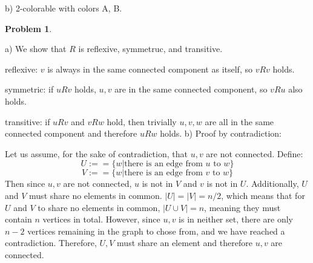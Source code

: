 \documentclass{amsart}
\theoremstyle{definition}
\newtheorem{problem}{Problem}
\theoremstyle{remark}
\begin{document}
b) 2-colorable with colors A, B.

\begin{problem}
\end{problem}
a) We show that $R$ is reflexive, symmetruc, and transitive.

reflexive: $v$ is always in the same connected component as itself, so $vRv$ holds.

symmetric: if $uRv$ holds, $u,v$ are in the same connected component, so $vRu$ also holds.

transitive: if $uRv$ and $vRw$ hold, then trivially $u,v,w$ are all in
the same connected component and therefore $uRw$ holds.
\newline
\newline
b) Proof by contradiction:

Let us assume, for the sake of contradiction, that $u,v$ are not
connected. Define:
\[
U:==\{ w | \text{there is an edge from $u$ to $w$}\}
\]
\[
V:==\{ w | \text{there is an edge from $v$ to $w$}\}
\]
Then since $u,v$ are not connected, $u$ is not in $V$ and $v$ is not
in $U$.  Additionally, $U$ and $V$ must share no elements in common.
$|U|=|V|=n/2$, which means that for $U$ and $V$ to share no elements
in common, $|U\cup V|=n$, meaning they must contain $n$ vertices in
total.  However, since $u,v$ is in neither set, there are only $n-2$
vertices remaining in the graph to chose from, and we have reached a
contradiction.  Therefore, $U,V$ must share an element and therefore
$u,v$ are connected.
\end{document}

